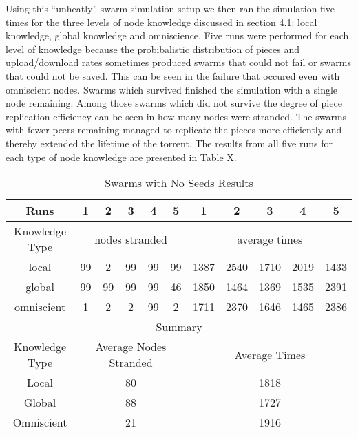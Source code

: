 Using this ``unheatly'' swarm simulation setup we then ran the
simulation five times for the three levels of node knowledge discussed
in section 4.1: local knowledge, global knowledge and
omniscience. Five runs were performed for each level of knowledge
because the probibalistic distribution of pieces and upload/download
rates sometimes produced swarms that could not fail or swarms that
could not be saved. This can be seen in the failure that occured even
with omniscient nodes. Swarms which survived finished the simulation
with a single node remaining. Among those swarms which did not survive
the degree of piece replication efficiency can be seen in how many
nodes were stranded. The swarms with fewer peers remaining managed to
replicate the pieces more efficiently and thereby extended the
lifetime of the torrent. The results from all five runs for each type
of node knowledge are presented in Table X.

\begin{table*}
\centering
\caption{Swarms with No Seeds Results}
\begin{tabular}{|c|c|c|c|c|c|c|c|c|c|c|} \hline
Runs & 1 & 2 & 3 & 4 & 5 & 1 & 2 & 3 & 4 & 5\\ \hline
Knowledge Type & \multicolumn{5}{c|}{nodes stranded} & \multicolumn{5}{c|}{average times}\\ \hline
local      & 99&  2& 99& 99& 99&1387&2540&1710&2019&1433\\
global     & 99& 99& 99& 99& 46&1850&1464&1369&1535&2391\\
omniscient &  1&  2&  2& 99&  2&1711&2370&1646&1465&2386\\ \hline \hline
\multicolumn{11}{|c|}{Summary}\\ \hline
Knowledge Type & \multicolumn{5}{c|}{Average Nodes Stranded} & \multicolumn{5}{c|}{Average Times}\\ \hline
Local & \multicolumn{5}{c|}{80} & \multicolumn{5}{c|}{1818}\\
Global & \multicolumn{5}{c|}{88} & \multicolumn{5}{c|}{1727}\\
Omniscient & \multicolumn{5}{c|}{21} & \multicolumn{5}{c|}{1916}\\
\hline\end{tabular}
\label{tab:noseedresults}
\end{table*}


